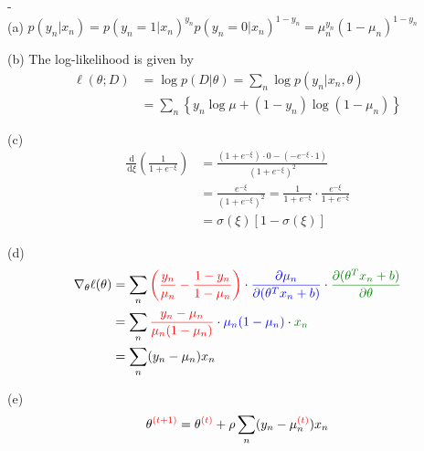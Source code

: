 \documentclass[a4paper]{article}
\def\r#1{{\color{red}#1}}
\def\b#1{{\color{blue}#1}}
\def\g#1{{\color{mygreen}#1}}
\def\d#1{{\,\mathrm{d}#1}}
\begin{document}
\begin{ExerciseList}
\Answer[ref={ex:logistic-regression}]-\\

(a) $p(y_n|x_n) = p(y_n=1|x_n)^{y_n} p(y_n=0|x_n)^{1-y_n} = \mu_n^{y_n}(1-\mu_n)^{1-y_n}$

(b) The log-likelihood is given by
\begin{align*} \ell(\theta;D) &= \log p(D|\theta) = \sum_n \log p(y_n|x_n,\theta)\\
&= \sum_n \left\{y_n \log \mu + (1-y_n)\log(1-\mu_n)\right\}
\end{align*}

(c) \begin{align*}
\frac{\d{}}{\d{\xi}}\left( \frac{1}{1+e^{-\xi}}\right) &= \frac{(1+e^{-\xi})\cdot 0 - (-e^{-\xi}\cdot 1)}{(1+e^{-\xi})^2}\\
&= \frac{e^{-\xi}}{(1+e^{-\xi})^2} = \frac{1}{1+e^{-\xi}}\cdot \frac{e^{-\xi}}{1+e^{-\xi}}\\
&=\sigma(\xi)\left[ 1-\sigma(\xi)\right]
\end{align*}

(d)
\begin{align*}
\nabla_\theta \ell(\theta) &= \sum_n \r{\left(\frac{y_n}{\mu_n} - \frac{1-y_n}{1-\mu_n} \right)} \cdot \b{\frac{\partial{\mu_n}}{\partial{(\theta^T x_n +b)}}} \cdot \g{\frac{\partial{(\theta^T x_n +b)}}{\partial{\theta}}}\\
&= \sum_n \r{\frac{y_n - \mu_n}{\mu_n(1-\mu_n)}} \cdot \b{\mu_n(1-\mu_n)} \cdot \g{x_n}\\
&= \sum_n (y_n - \mu_n)x_n
\end{align*}

(e)
$$ \theta^{\r{(t+1)}} = \theta^{\r{(t)}} + \rho \sum_n (y_n - \mu_n^{\r{(t)}})x_n$$





\medskip

%



\end{ExerciseList}
\end{document}
